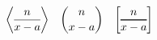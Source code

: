\documentclass{book}
\begin{document}
\begin{equation*}
\genfrac{\langle}{\rangle}{}{}{n}{x-a}\quad
\genfrac{(}{)}{0pt}{}{n}{x-a}\quad
\genfrac{[}{]}{1pt}{}{n}{x-a}
\end{equation*}
\end{document}
